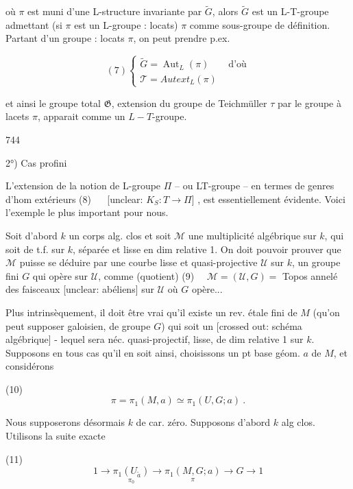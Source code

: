 où $\pi$ est muni d'une L-structure
invariante par $\tilde{G}$, alors $\tilde{G}$ est
un L-T-groupe admettant (si $\pi$ est
un L-groupe : locats) $\pi$ comme
sous-groupe de définition. Partant
d'un groupe : locats $\pi$, on peut
prendre p.ex.

$$ (7) \begin{cases} \tilde{G} = \operatorname{Aut}_L(\pi) \qquad \text{d'où} \\ \mathcal{T} = Autext_L(\pi) \end{cases} $$

\newpage


et ainsi le groupe total $\mathfrak{G}$,
extension du groupe de Teichmüller
$\tau$ par le groupe à lacets $\pi$, apparait
comme un $L-T$-groupe.

\newpage


744

2°) Cas profini

L'extension de la notion de L-groupe $\Pi$
-- ou LT-groupe -- en termes de
genres d'hom extérieurs
(8) $\quad$ [unclear: $K_S : T \to \Pi$] ,
est essentiellement évidente. Voici
l'exemple le plus important pour
nous. 

Soit d'abord $k$ un corps alg.
clos et soit $\mathcal{M}$ une
multiplicité algébrique sur $k$, qui
soit de t.f. sur $k$, séparée
et lisse en dim relative 1. On
doit pouvoir prouver que
$\mathcal{M}$ puisse se déduire par une
courbe lisse et quasi-projective
$\mathcal{U}$ sur $k$, un groupe fini $G$
qui opère sur $\mathcal{U}$, comme (quotient)
(9) $\quad \mathcal{M} = (\mathcal{U}, G) =$ Topos annelé des
faisceaux [unclear: abéliens] sur
$\mathcal{U}$ où $G$ opère...

\newpage


Plus intrinsèquement, il doit être
vrai qu'il existe un rev. étale fini
de $M$ (qu'on peut supposer galoisien,
de groupe $G$) qui soit un
[crossed out: schéma algébrique] - lequel sera néc.
quasi-projectif, lisse, de dim relative 1
sur $k$. Supposons en tous cas
qu'il en soit ainsi, choisissons
un pt base géom. $a$ de $M$, et
considérons

(10) $$\pi = \pi_1(M, a) \simeq \pi_1(U, G; a) \ .$$

Nous supposerons désormais $k$ de
car. zéro. Supposons d'abord $k$
alg clos. Utilisons la suite exacte

(11) $$1 \longrightarrow \underset{\pi_0}{\pi_1(U_{\tilde{a}})} \longrightarrow \underset{\pi}{\pi_1(M, G; a)} \longrightarrow G \longrightarrow 1$$

